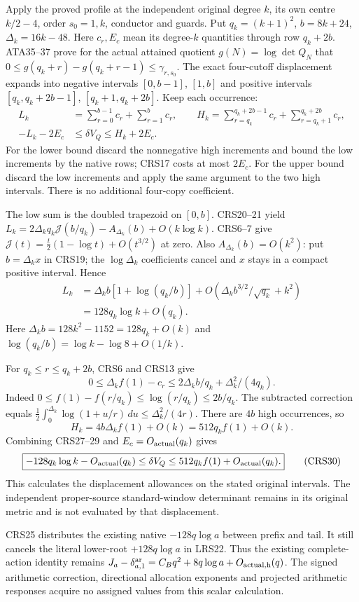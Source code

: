 Apply the proved profile at the independent original degree $k$,
its own centre $k/2-4$, order $s_0=1,k$, conductor and guards.
Put $q_k=(k+1)^2$, $b=8k+24$, $\Delta_k=16k-48$.
Here $c_r,E_c$ mean its degree-$k$ quantities through row $q_k+2b$.
ATA35--37 prove for the actual attained quotient $g(N)=\log\det Q_N$
that $0\le g(q_k+r)-g(q_k+r-1)\le\gamma_{r,s_0}$.
The exact four-cutoff displacement expands into negative intervals
$[0,b-1]$, $[1,b]$ and positive intervals
$[q_k,q_k+2b-1]$, $[q_k+1,q_k+2b]$. Keep each occurrence:
\[
\begin{split}
 L_k&=\sum_{r=0}^{b-1}c_r+\sum_{r=1}^{b}c_r,\qquad
 H_k=\sum_{r=q_k}^{q_k+2b-1}c_r+
                               \sum_{r=q_k+1}^{q_k+2b}c_r,\\
 -L_k-2E_c&\le\delta V_Q\le H_k+2E_c .
\end{split}                                                    \tag{CRS27}
\]
For the lower bound discard the nonnegative high increments and
bound the low increments by the native rows; CRS17 costs at most
$2E_c$. For the upper bound discard the low increments and apply
the same argument to the two high intervals. There is no additional
four-copy coefficient.

The low sum is the doubled trapezoid on $[0,b]$. CRS20--21 yield
$L_k=2\Delta_kq_k\mathcal J(b/q_k)-A_{\Delta_k}(b)+O(k\log k)$.
CRS6--7 give
$\mathcal J(t)=\tfrac t2(1-\log t)+O(t^{3/2})$ at zero.
Also $A_{\Delta_k}(b)=O(k^2)$: put $b=\Delta_kx$ in CRS19;
the $\log\Delta_k$ coefficients cancel and $x$ stays in a compact
positive interval. Hence
\[
\begin{split}
 L_k&=\Delta_kb[1+\log(q_k/b)]
        +O(\Delta_kb^{3/2}/\sqrt{q_k}+k^2)\\
    &=128q_k\log k+O(q_k).
\end{split}                                                    \tag{CRS28}
\]
Here $\Delta_kb=128k^2-1152=128q_k+O(k)$ and
$\log(q_k/b)=\log k-\log8+O(1/k)$.

For $q_k\le r\le q_k+2b$, CRS6 and CRS13 give
\[
 0\le\Delta_k f(1)-c_r
       \le2\Delta_k b/q_k+\Delta_k^2/(4q_k).
\]
Indeed $0\le f(1)-f(r/q_k)\le\log(r/q_k)\le2b/q_k$.
The subtracted correction equals
$\tfrac12\int_0^{\Delta_k}\log(1+u/r)\,du
\le\Delta_k^2/(4r)$. There are $4b$ high occurrences, so
\[
 H_k=4b\Delta_k f(1)+O(k)=512q_k f(1)+O(k).            \tag{CRS29}
\]
Combining CRS27--29 and $E_c=O_{\rm actual}(q_k)$ gives
\[
 \boxed{-128q_k\log k-O_{\rm actual}(q_k)
       \le\delta V_Q\le512q_k f(1)+O_{\rm actual}(q_k).}\tag{CRS30}
\]
This calculates the displacement allowances on the stated original
intervals. The independent proper-source standard-window determinant
remains in its original metric and is not evaluated by that displacement.

CRS25 distributes the existing native $-128q\log a$ between prefix
and tail. It still cancels the literal lower-root $+128q\log a$
in LRS22. Thus the existing complete-action identity remains
$J_a-\delta^{\rm ar}_{a,1}
=C_Bq^2+8q\log a+O_{\rm actual,h}(q)$.
The signed arithmetic correction, directional allocation exponents
and projected arithmetic responses acquire no assigned values from
this scalar calculation.
\endgroup
